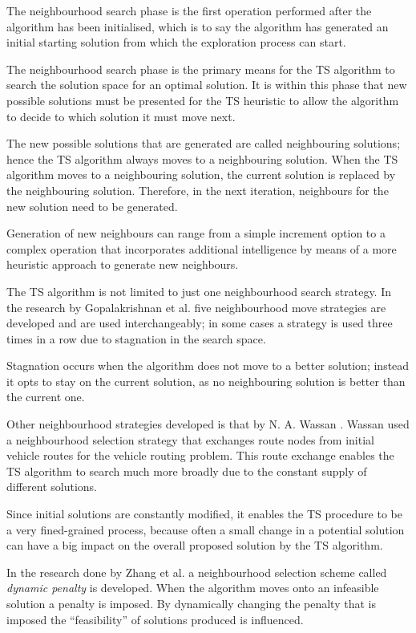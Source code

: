 The neighbourhood search phase is the first operation performed after the algorithm has been initialised, which is to say the algorithm has generated an initial starting solution from which the exploration process can start.

The neighbourhood search phase is the primary means for the \gls{TS} algorithm to search the solution space for an optimal solution. It is within this phase that new possible solutions must be presented for the \gls{TS} heuristic to allow the algorithm to decide to which solution it must move next.

The new possible solutions that are generated are called neighbouring solutions; hence the \gls{TS} algorithm always moves to a neighbouring solution. When the \gls{TS} algorithm moves to a neighbouring solution, the current solution is replaced by the neighbouring solution. Therefore, in the next iteration, neighbours for the new solution need to be generated.

Generation of new neighbours can range from a simple increment option to a complex operation that incorporates additional intelligence by means of a more heuristic approach to generate new neighbours.

The \gls{TS} algorithm is not limited to just one neighbourhood search strategy. In the research by Gopalakrishnan et al.\cite{TabuCarryOver} five neighbourhood move strategies are developed and are used interchangeably; in some cases a strategy is used three times in a row due to stagnation in the search space. 

Stagnation occurs when the algorithm does not move to a better solution; instead it opts to stay on the current solution, as no neighbouring solution is better than the current one. 

Other neighbourhood strategies developed is that by N. A. Wassan \cite{ReactiveTabuVHR}. Wassan used a neighbourhood selection strategy that exchanges route nodes from initial vehicle routes for the vehicle routing problem. This route exchange enables the \gls{TS} algorithm to search much more broadly due to the constant supply of different solutions. 

Since initial solutions are constantly modified, it enables the \gls{TS} procedure to be a very fined-grained process, because often a small change in a potential solution can have a big impact on the overall proposed solution by the \gls{TS} algorithm.

In the research done by Zhang et al.\cite{TSHazardous} a neighbourhood selection scheme called \emph{dynamic penalty} is developed. When the algorithm moves onto an infeasible solution a penalty is imposed. By dynamically changing the penalty that is imposed the ``feasibility'' of solutions produced is influenced. 

